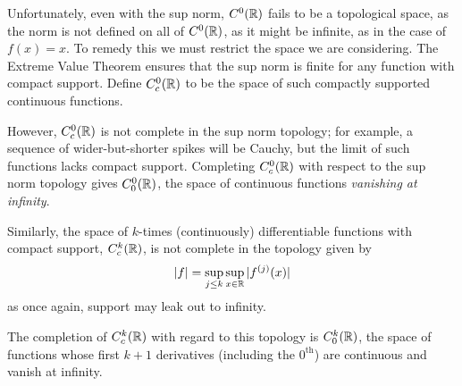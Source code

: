 \documentclass[thesis.tex]{subfiles}
\begin{document}
      Unfortunately, even with the sup norm, $C^0(\mathbb{R})$ fails to be a topological space, as the norm is not defined on all of $C^0(\mathbb{R})$, as it might be infinite, as in the case of $f(x)=x$.
      To remedy this we must restrict the space we are considering.
      The Extreme Value Theorem ensures that the sup norm is finite for any function with compact support.
      Define $C^0_c(\mathbb{R})$ to be the space of such compactly supported continuous functions.

      However, $C^0_c(\mathbb{R})$ is not complete in the sup norm topology; for example, a sequence of wider-but-shorter spikes will be Cauchy, but the limit of such functions lacks compact support. 
      Completing $C^0_c(\mathbb{R})$ with respect to the sup norm topology gives $C_0^0(\mathbb{R})$, the space of continuous functions \emph{vanishing at infinity}. 

      Similarly, the space of $k$-times (continuously) differentiable functions with compact support, $C_c^k(\mathbb{R})$, is not complete in the topology given by
      \begin{equation*}
        |f| = \sup_{j\le k} \sup_{x\in\mathbb{R}} |f^{(j)}(x)|
      \end{equation*}
      as once again, support may leak out to infinity.

      The completion of $C_c^k(\mathbb{R})$ with regard to this topology is $C_0^k(\mathbb{R})$, the space of functions whose first $k+1$ derivatives (including the $0^\text{th}$) are continuous and vanish at infinity. 
\end{document}
